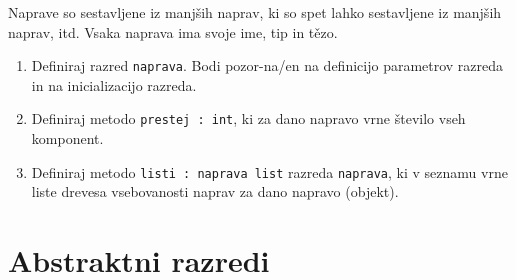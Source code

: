 \begin{ex}
Naprave so sestavljene iz manj\v sih naprav, ki so spet lahko sestavljene iz manj\v sih naprav, itd. Vsaka naprava ima svoje ime, tip in te\v\/zo.
\begin{enumerate}[label=(\Alph*)]
\item Definiraj razred \lstinline{naprava}. Bodi pozor-na/en na definicijo parametrov razreda in na inicializacijo razreda. 

\item Definiraj metodo \lstinline{prestej : int}, ki za dano napravo vrne število vseh komponent. 

\item Definiraj metodo \lstinline{listi : naprava list} razreda \lstinline{naprava}, ki v seznamu vrne liste drevesa vsebovanosti naprav za dano napravo (objekt).
\end{enumerate}
\end{ex} 








\section{Abstraktni razredi}


